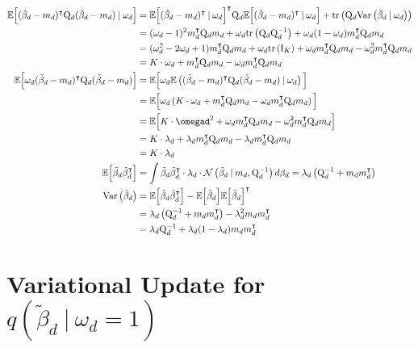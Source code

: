 \documentclass[twoside,11pt]{article}
\newcommand\given[1][]{\:#1\vert\:}
\newcommand{\transpose}[1]{#1^{\intercal}}
\newcommand{\E}{\mathbb{E}}
\newcommand{\betad}{\tilde{\beta}_d}
\newcommand{\qmat}{\mathrm{Q}}
\newcommand{\qbeta}{\mathcal{N} \left( \betad \given m_d, \qmat_d^{-1} \right)}
\newcommand{\trace}[1]{\mathrm{tr} \left( #1 \right)}
\newcommand{\var}[1]{\mathrm{Var}\left(#1\right)}
\begin{document}
\begin{align*}
	\E \Big[ \transpose{(\betad - m_d)} \qmat_{d}(\betad - m_d) \given \omega_d \Big] &= \transpose{\E \Big[ \transpose{(\betad - m_d)} \given \omega_d \Big]} \qmat_d \E \Big[ \transpose{(\betad - m_d)} \given \omega_d \Big] + \trace{\qmat_d \var{\betad \given \omega_d}} \\
	&= (\omega_d-1)^2 \transpose{m_d} \qmat_d m_d + \omega_d \trace{\qmat_d \qmat_d^{-1}} + \omega_d(1-\omega_d)\transpose{m_d}\qmat_d m_d \\
	&= (\omega_d^2 - 2\omega_d + 1)\transpose{m_d} \qmat_d m_d + \omega_d \trace{\mathrm{I}_K} + \omega_d\transpose{m_d}\qmat_d m_d -\omega_d^2\transpose{m_d}\qmat_d m_d \\
	&= K \cdot \omega_d + \transpose{m_d}\qmat_d m_d - \omega_d \transpose{m_d}\qmat_d m_d \\
	\E \Big[ \omega_d \transpose{(\betad - m_d)} \qmat_{d}(\betad - m_d) \Big] &= \E \Big[ \omega_d \E \left(\transpose{(\betad - m_d)} \qmat_{d}(\betad - m_d) \given \omega_d \right) \Big]\\
	&= \E \Big[ \omega_d \left( K \cdot \omega_d + \transpose{m_d}\qmat_d m_d - \omega_d \transpose{m_d}\qmat_d m_d\right) \Big] \\
	&= \E \Big[ K \cdot \omegad^2 + \omega_d \transpose{m_d}\qmat_d m_d - \omega_d^2 \transpose{m_d}\qmat_d m_d \Big] \\
	&= K \cdot \lambda_d + \lambda_d \transpose{m_d}\qmat_d m_d - \lambda_d \transpose{m_d}\qmat_d m_d \\
	&= K \cdot \lambda_d \\
	\E \Big[ \betad \transpose{\betad} \Big] &= \int \betad \transpose{\betad} \cdot  \lambda_d \cdot 
\qbeta d\beta_d = \lambda_d \left( \qmat_d^{-1} + m_d \transpose{m_d} \right) \\
	\var{\betad} &= \E \Big[ \betad \transpose{\betad} \Big] - \E \Big[ \betad\Big] \transpose{\E \Big[ \betad\Big]} \\
	&= \lambda_d \left( \qmat_d^{-1} + m_d \transpose{m_d} \right) - \lambda_d^2 m_d \transpose{m_d} \\
	&= \lambda_d \qmat_d^{-1} + \lambda_d(1 - \lambda_d) m_d \transpose{m_d}
\end{align*}

\newpage

\section{Variational Update for $q(\betad \given \omega_d = 1)$}
\end{document}
